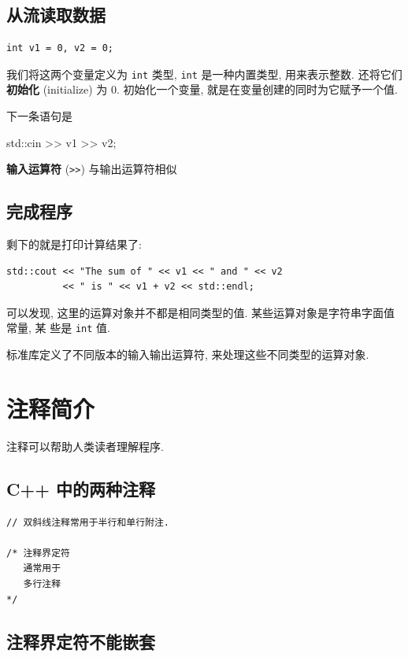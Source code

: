\documentclass[lang=cn]{elegantbook}
\begin{document}
\subsection{从流读取数据}
\label{sec:org6d86399}

\begin{verbatim}
int v1 = 0, v2 = 0;
\end{verbatim}

我们将这两个变量定义为 \texttt{int} 类型, \texttt{int} 是一种内置类型, 用来表示整数. 还将它们
\textbf{初始化} (initialize) 为 0. 初始化一个变量, 就是在变量创建的同时为它赋予一个值.

下一条语句是

std::cin >> v1 >> v2;

\textbf{输入运算符} (\texttt{>>}) 与输出运算符相似

\subsection{完成程序}
\label{sec:org7232608}

剩下的就是打印计算结果了:

\begin{verbatim}
std::cout << "The sum of " << v1 << " and " << v2
          << " is " << v1 + v2 << std::endl;
\end{verbatim}

可以发现, 这里的运算对象并不都是相同类型的值. 某些运算对象是字符串字面值常量, 某
些是 \texttt{int} 值.

标准库定义了不同版本的输入输出运算符, 来处理这些不同类型的运算对象.

\section{注释简介}
\label{sec:org3af03d5}

注释可以帮助人类读者理解程序.

\subsection{C++ 中的两种注释}
\label{sec:orgd39aca4}

\begin{verbatim}
// 双斜线注释常用于半行和单行附注.

/* 注释界定符
   通常用于
   多行注释
*/
\end{verbatim}

\subsection{注释界定符不能嵌套}
\label{sec:org1097362}
\end{document}
